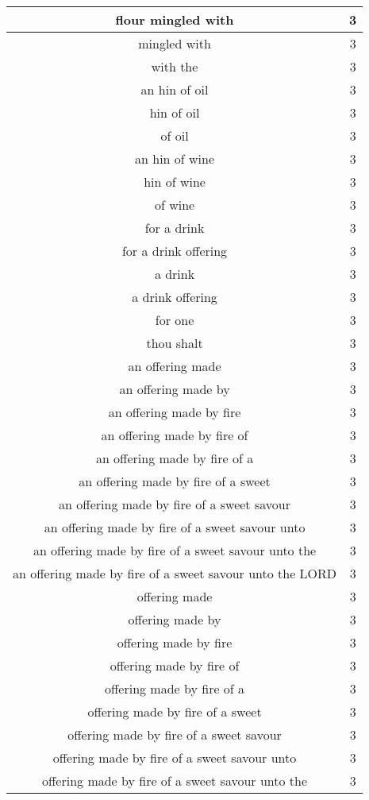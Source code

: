 \begin{center}
\begin{longtable}{|c|c|}
flour mingled with & 3\\ \hline 
mingled with & 3\\ \hline 
with the & 3\\ \hline 
an hin of oil & 3\\ \hline 
hin of oil & 3\\ \hline 
of oil & 3\\ \hline 
an hin of wine & 3\\ \hline 
hin of wine & 3\\ \hline 
of wine & 3\\ \hline 
for a drink & 3\\ \hline 
for a drink offering & 3\\ \hline 
a drink & 3\\ \hline 
a drink offering & 3\\ \hline 
for one & 3\\ \hline 
thou shalt & 3\\ \hline 
an offering made & 3\\ \hline 
an offering made by & 3\\ \hline 
an offering made by fire & 3\\ \hline 
an offering made by fire of & 3\\ \hline 
an offering made by fire of a & 3\\ \hline 
an offering made by fire of a sweet & 3\\ \hline 
an offering made by fire of a sweet savour & 3\\ \hline 
an offering made by fire of a sweet savour unto & 3\\ \hline 
an offering made by fire of a sweet savour unto the & 3\\ \hline 
an offering made by fire of a sweet savour unto the LORD & 3\\ \hline 
offering made & 3\\ \hline 
offering made by & 3\\ \hline 
offering made by fire & 3\\ \hline 
offering made by fire of & 3\\ \hline 
offering made by fire of a & 3\\ \hline 
offering made by fire of a sweet & 3\\ \hline 
offering made by fire of a sweet savour & 3\\ \hline 
offering made by fire of a sweet savour unto & 3\\ \hline 
offering made by fire of a sweet savour unto the & 3\\ \hline 

\end{longtable}
\end{center}
